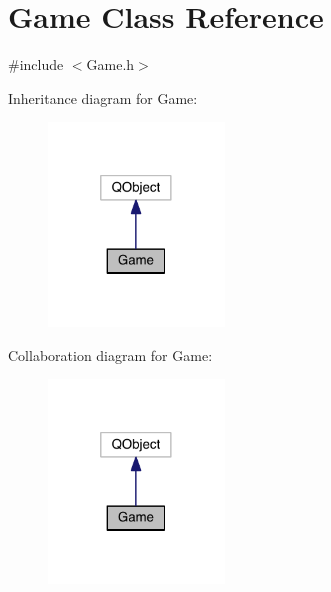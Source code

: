 \hypertarget{class_game}{\section{Game Class Reference}
\label{class_game}
}


{\ttfamily \#include $<$Game.\+h$>$}



Inheritance diagram for Game\+:\nopagebreak
\begin{figure}[H]
\begin{center}
\leavevmode
\includegraphics[width=133pt]{class_game__inherit__graph}
\end{center}
\end{figure}


Collaboration diagram for Game\+:\nopagebreak
\begin{figure}[H]
\begin{center}
\leavevmode
\includegraphics[width=133pt]{class_game__coll__graph}
\end{center}
\end{figure}
